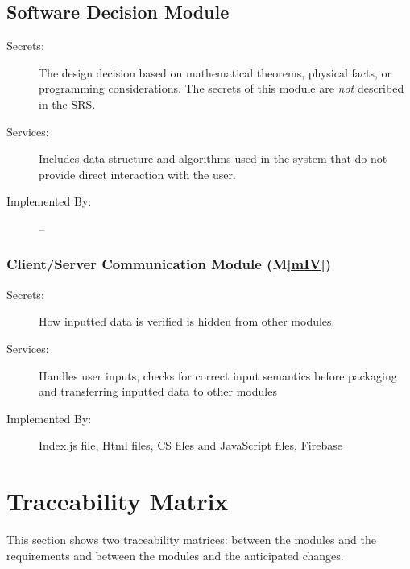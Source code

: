 \documentclass[12pt, titlepage]{article}
\newcommand{\mref}[1]{M\ref{#1}}
\begin{document}
\subsection{Software Decision Module}

\begin{description}
\item[Secrets:] The design decision based on mathematical theorems, physical
  facts, or programming considerations. The secrets of this module are
  \emph{not} described in the SRS.
\item[Services:] Includes data structure and algorithms used in the system that
  do not provide direct interaction with the user. 
\item[Implemented By:] --
\end{description}

\subsubsection{Client/Server Communication Module (\mref{mIV})}
\begin{description}
\item[Secrets:]How inputted data is verified is hidden from other modules.
\item[Services:]Handles user inputs, checks for correct input semantics before packaging and transferring inputted data to other modules
\item[Implemented By:]Index.js file, Html files, CS files and JavaScript files, Firebase
\end{description}


\section{Traceability Matrix} \label{SecTM}

This section shows two traceability matrices: between the modules and the
requirements and between the modules and the anticipated changes.
\end{document}
